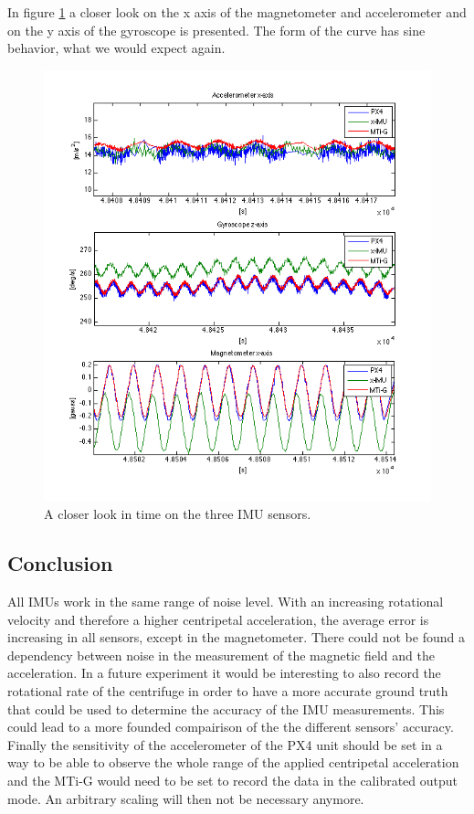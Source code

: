 In figure \ref{ct_sine} a closer look on the x axis of the magnetometer and accelerometer and on the y axis of the gyroscope is presented. The form of the curve has sine behavior, what we would expect again.
\begin{figure}[hb]
\includegraphics[width=1\textwidth]{pictures/ct_sine.png}
\caption{A closer look in time on the three IMU sensors.}
\label{ct_sine}
\end{figure}

\FloatBarrier
\subsection{Conclusion}
All IMUs work in the same range of noise level. With an increasing rotational velocity and therefore a higher centripetal acceleration, the average error is increasing in all sensors, except in the magnetometer. There could not be found a dependency between noise in the measurement of the magnetic field and the acceleration. 
In a future experiment it would be interesting to also record the rotational rate of the centrifuge in order to have a more accurate ground truth that could be used to determine the accuracy of the IMU measurements. This could lead to a more founded compairison of the the different sensors' accuracy. Finally the sensitivity of the accelerometer of the PX4 unit should be set in a way to be able to observe the whole range of the applied centripetal acceleration and the MTi-G would need to be set to record the data in the calibrated output mode. An arbitrary scaling will then not be necessary anymore.

